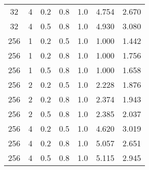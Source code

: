 \begin{table}
\begin{tabular}{|c|c|c|c|c|c|c|}
     32 &       4 & 0.2 & 0.8 &            1.0 &          4.754 &               2.670 \\
     32 &       4 & 0.5 & 0.8 &            1.0 &          4.930 &               3.080 \\
    256 &       1 & 0.2 & 0.5 &            1.0 &          1.000 &               1.442 \\
    256 &       1 & 0.2 & 0.8 &            1.0 &          1.000 &               1.756 \\
    256 &       1 & 0.5 & 0.8 &            1.0 &          1.000 &               1.658 \\
    256 &       2 & 0.2 & 0.5 &            1.0 &          2.228 &               1.876 \\
    256 &       2 & 0.2 & 0.8 &            1.0 &          2.374 &               1.943 \\
    256 &       2 & 0.5 & 0.8 &            1.0 &          2.385 &               2.037 \\
    256 &       4 & 0.2 & 0.5 &            1.0 &          4.620 &               3.019 \\
    256 &       4 & 0.2 & 0.8 &            1.0 &          5.057 &               2.651 \\
    256 &       4 & 0.5 & 0.8 &            1.0 &          5.115 &               2.945 \\
\bottomrule
\end{tabular}
\end{table}